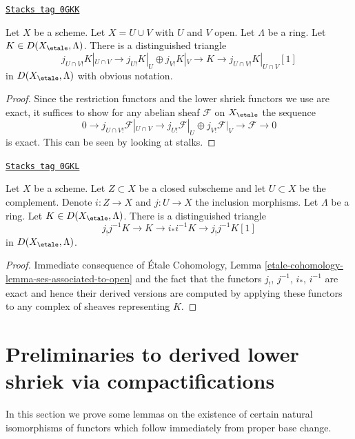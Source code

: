 \begin{lemma}
\label{more-etale-lemma-mayer-vietoris-shriek}
\href{https://stacks.math.columbia.edu/tag/0GKK}{\texttt{Stacks tag 0GKK}}

Let $X$ be a scheme. Let $X = U \cup V$ with $U$ and $V$ open.
Let $\Lambda$ be a ring. Let $K \in D(X_\etale, \Lambda)$. There
is a distinguished triangle
$$
j_{U \cap V!}K|_{U \cap V} \to
j_{U!}K|_U \oplus j_{V!}K|_V \to K \to
j_{U \cap V!}K|_{U \cap V}[1]
$$
in $D(X_\etale, \Lambda)$ with obvious notation.
\end{lemma}

\begin{proof}
Since the restriction functors and the lower shriek functors we use
are exact, it suffices to show for any abelian sheaf $\mathcal{F}$ on
$X_\etale$ the sequence
$$
0 \to j_{U \cap V!}\mathcal{F}|_{U \cap V} \to
j_{U!}\mathcal{F}|_U \oplus j_{V!}\mathcal{F}|_V \to \mathcal{F} \to 0
$$
is exact. This can be seen by looking at stalks.
\end{proof}

\begin{lemma}
\label{more-etale-lemma-triangle-associated-to-open}
\href{https://stacks.math.columbia.edu/tag/0GKL}{\texttt{Stacks tag 0GKL}}

Let $X$ be a scheme. Let $Z \subset X$ be a closed subscheme and let
$U \subset X$ be the complement. Denote $i : Z \to X$ and $j : U \to X$
the inclusion morphisms. Let $\Lambda$ be a ring.
Let $K \in D(X_\etale, \Lambda)$. There is a distinguished triangle
$$
j_!j^{-1}K \to K \to i_*i^{-1}K \to j_!j^{-1}K[1]
$$
in $D(X_\etale, \Lambda)$.
\end{lemma}

\begin{proof}
Immediate consequence of \'Etale Cohomology, Lemma
\ref{etale-cohomology-lemma-ses-associated-to-open}
and the fact that the functors $j_!$, $j^{-1}$, $i_*$, $i^{-1}$
are exact and hence their derived versions are computed by
applying these functors to any complex of sheaves representing $K$.
\end{proof}

\section{Preliminaries to derived lower shriek via compactifications}
\label{more-etale-section-prelim}
In this section we prove some lemmas on the existence of
certain natural isomorphisms of functors which follow immediately
from proper base change.

